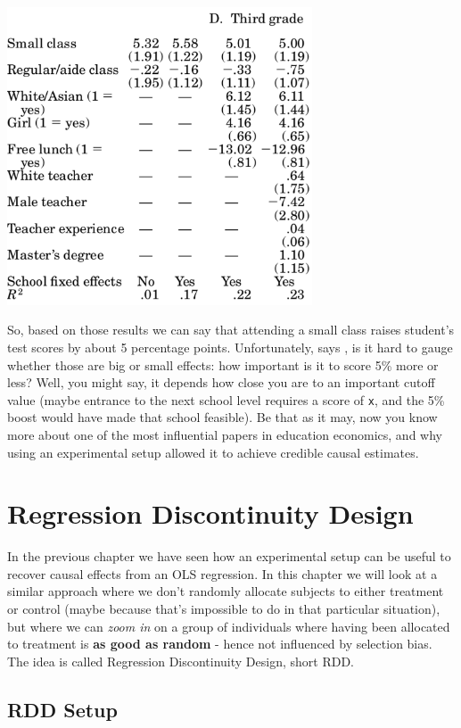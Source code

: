 \documentclass[]{book}
\begin{document}
\includegraphics[width=3.56in]{images/krueger5}

So, based on those results we can say that attending a small class
raises student's test scores by about 5 percentage points.
Unfortunately, says \citet{krueger1999}, is it hard to gauge whether
those are big or small effects: how important is it to score 5\% more or
less? Well, you might say, it depends how close you are to an important
cutoff value (maybe entrance to the next school level requires a score
of \texttt{x}, and the 5\% boost would have made that school feasible).
Be that as it may, now you know more about one of the most influential
papers in education economics, and why using an experimental setup
allowed it to achieve credible causal estimates.

\chapter{Regression Discontinuity Design}\label{RDD}

In the previous chapter we have seen how an experimental setup can be
useful to recover causal effects from an OLS regression. In this chapter
we will look at a similar approach where we don't randomly allocate
subjects to either treatment or control (maybe because that's impossible
to do in that particular situation), but where we can \emph{zoom in} on
a group of individuals where having been allocated to treatment is
\textbf{as good as random} - hence not influenced by selection bias. The
idea is called Regression Discontinuity Design, short RDD.

\section{RDD Setup}\label{rdd-setup}
\end{document}
